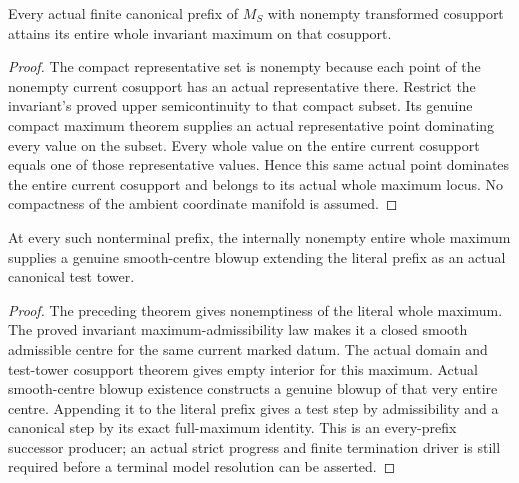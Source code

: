 \begin{theorem}
\label{hir:homogeneous-model-every-prefix-whole-maximum}
Every actual finite canonical prefix of $M_S$ with nonempty transformed
cosupport attains its entire whole invariant maximum on that cosupport.
\leanok
{}
\end{theorem}
\begin{proof}
The compact representative set is nonempty because each point of the
nonempty current cosupport has an actual representative there. Restrict
the invariant's proved upper semicontinuity to that compact subset.
Its genuine compact maximum theorem supplies an actual representative
point dominating every value on the subset. Every whole value on the
entire current cosupport equals one of those representative values.
Hence this same actual point dominates the entire current cosupport
and belongs to its actual whole maximum locus. No compactness of the
ambient coordinate manifold is assumed.
\end{proof}

\begin{theorem}
\label{hir:homogeneous-model-every-prefix-actual-canonical-successor}
At every such nonterminal prefix, the internally nonempty entire whole
maximum supplies a genuine smooth-centre blowup extending the literal
prefix as an actual canonical test tower.
\leanok
{}
\end{theorem}
\begin{proof}
The preceding theorem gives nonemptiness of the literal whole maximum.
The proved invariant maximum-admissibility law makes it a closed smooth
admissible centre for the same current marked datum. The actual domain
and test-tower cosupport theorem gives empty interior for this maximum.
Actual smooth-centre blowup existence constructs a genuine blowup of
that very entire centre. Appending it to the literal prefix gives a
test step by admissibility and a canonical step by its exact full-maximum
identity. This is an every-prefix successor producer; an actual strict
progress and finite termination driver is still required before a
terminal model resolution can be asserted.
\end{proof}
